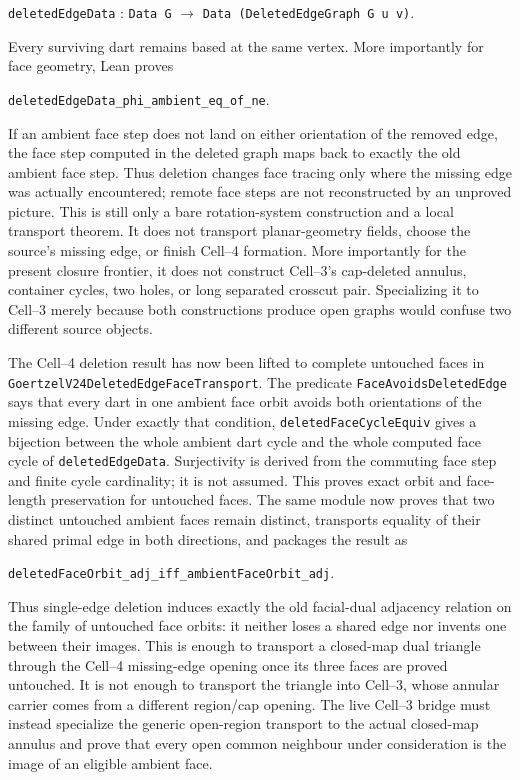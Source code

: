 \documentclass[11pt]{article}
\theoremstyle{definition}
\begin{document}
\begin{center}
\texttt{deletedEdgeData} :
\texttt{Data G} $\longrightarrow$
\texttt{Data (DeletedEdgeGraph G u v)}.
\end{center}

Every surviving dart remains based at the same vertex.  More importantly for
face geometry, Lean proves

\begin{center}
\texttt{deletedEdgeData\_phi\_ambient\_eq\_of\_ne}.
\end{center}

If an ambient face step does not land on either orientation of the removed
edge, the face step computed in the deleted graph maps back to exactly the old
ambient face step.  Thus deletion changes face tracing only where the missing
edge was actually encountered; remote face steps are not reconstructed by an
unproved picture.  This is still only a bare rotation-system construction and
a local transport theorem.  It does not transport planar-geometry fields,
choose the source's missing edge, or finish Cell--4 formation.  More
importantly for the present closure frontier, it does not construct Cell--3's
cap-deleted annulus, container cycles, two holes, or long separated crosscut
pair.  Specializing it to Cell--3 merely because both constructions produce
open graphs would confuse two different source objects.

The Cell--4 deletion result has now been lifted to complete untouched faces in
\texttt{GoertzelV24DeletedEdgeFaceTransport}.  The predicate
\texttt{FaceAvoidsDeletedEdge} says that every dart in one ambient face orbit
avoids both orientations of the missing edge.  Under exactly that condition,
\texttt{deletedFaceCycleEquiv} gives a bijection between the whole ambient
dart cycle and the whole computed face cycle of \texttt{deletedEdgeData}.
Surjectivity is derived from the commuting face step and finite cycle
cardinality; it is not assumed.  This proves exact orbit and face-length
preservation for untouched faces.  The same module now proves that two distinct
untouched ambient faces remain distinct, transports equality of their shared
primal edge in both directions, and packages the result as

\begin{center}
\texttt{deletedFaceOrbit\_adj\_iff\_ambientFaceOrbit\_adj}.
\end{center}

Thus single-edge deletion induces exactly the old facial-dual adjacency relation on the
family of untouched face orbits: it neither loses a shared edge nor invents
one between their images.  This is enough to transport a closed-map dual
triangle through the Cell--4 missing-edge opening once its three faces are
proved untouched.  It is not enough to transport the triangle into Cell--3,
whose annular carrier comes from a different region/cap opening.  The live
Cell--3 bridge must instead specialize the generic open-region transport to
the actual closed-map annulus and prove that every open common neighbour under
consideration is the image of an eligible ambient face.
\end{document}
